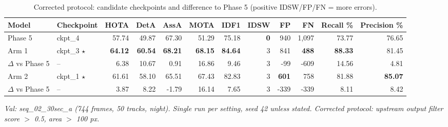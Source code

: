 \begin{table}[t]
\centering
\small
\caption{Corrected protocol: candidate checkpoints and difference to Phase 5 (positive IDSW/FP/FN = more errors).}
\begin{tabular}{llrrrrrrrrrr}
\toprule
Model & Checkpoint & HOTA & DetA & AssA & MOTA & IDF1 & IDSW & FP & FN & Recall \% & Precision \% \\
\midrule
Phase 5 & ckpt\_4 & 57.74 & 49.87 & 67.30 & 51.29 & 75.18 & \textbf{0} & 940 & 1,097 & 73.77 & 76.65 \\
Arm 1 & ckpt\_3 $\star$ & \textbf{64.12} & \textbf{60.54} & \textbf{68.21} & \textbf{68.15} & \textbf{84.64} & 3 & 841 & \textbf{488} & \textbf{88.33} & 81.45 \\
$\Delta$ vs Phase 5 & -- & 6.38 & 10.67 & 0.91 & 16.86 & 9.46 & 3 & -99 & -609 & 14.56 & 4.81 \\
Arm 2 & ckpt\_1 $\star$ & 61.61 & 58.10 & 65.51 & 67.43 & 82.83 & 3 & \textbf{601} & 758 & 81.88 & \textbf{85.07} \\
$\Delta$ vs Phase 5 & -- & 3.87 & 8.22 & -1.79 & 16.14 & 7.65 & 3 & -339 & -339 & 8.11 & 8.42 \\
\bottomrule
\end{tabular}
\par\smallskip\footnotesize\emph{Val: seq\_02\_30sec\_a (744 frames, 50 tracks, night). Single run per setting, seed 42 unless stated. Corrected protocol: upstream output filter score $>$ 0.5, area $>$ 100 px.}
\end{table}
